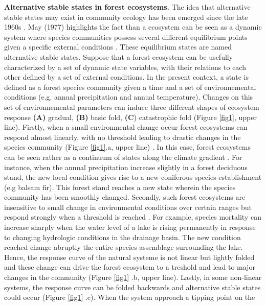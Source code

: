 \textbf{Alternative stable states in forest ecosystems.} The idea that
alternative stable states may exist in community ecology has been emerged
since the late 1960s \cite{Scheffer2001,Society2014a}. May (1977) highlights
the fact than a ecosystem can be seen as a dynamic system where species
communities possess several different equilibrium points given a specific
external conditions \cite{May1977}. These equilibrium states are named
alternative stable states. Suppose that a forest ecosystem can be usefully
characterized by a set of dynamic state variables, with their relations to
each other defined by a set of external conditions. In the present context, a
state is defined as a forest species community given a time and a set of
environnemental conditions (e.g. annual precipitation and annual temperature).
Changes on this set of environnemental parameters can induce three different
shapes of ecosystem response \textbf{(A)} gradual, \textbf{(B)} basic fold,
\textbf{(C}) catastrophic fold  \cite{Scheffer2001} (Figure \ref{fig1}, upper
line). Firstly, when a small environmental change occur forest ecosystems can
respond almost linearly, with no threshold leading to drastic changes in the
species community (Figure \ref{fig1}.a, upper line)
\cite{Scheffer2001,Scheffer2009}. In this case, forest ecosystems can be seen
rather as a continuum of states along the climate gradient
\cite{Scheffer2001,Scheffer2009,scheffer2009critical}. For instance, when the
annual precipitation increase slightly in a forest deciduous stand, the new
local condition gives rise to a new coniferous species establishment (e.g
balsam fir). This forest stand reaches a new state wherein the species
community has been smoothly changed. Secondly, such forest ecosystems are
insensitive to small change in environmental conditions over certain ranges
but respond strongly when a threshold is reached \cite{scheffer2009critical}.
For example, species mortality can increase sharply when the water level of a
lake is rising permanently in response to changing hydrologic conditions in
the drainage basin. The new condition reached change abruptly the entire
species assemblage surrounding the lake. Hence, the response curve of the
natural systeme is not linear but lightly folded and these change can drive
the forest ecosystem to a treshold and lead to major changes in the community
(Figure \ref{fig1} .b, upper line). Lastly, in some non-linear systems, the
response curve can be folded backwards and alternative stable states could
occur (Figure \ref{fig1} .c). When the system approach a tipping point on the

